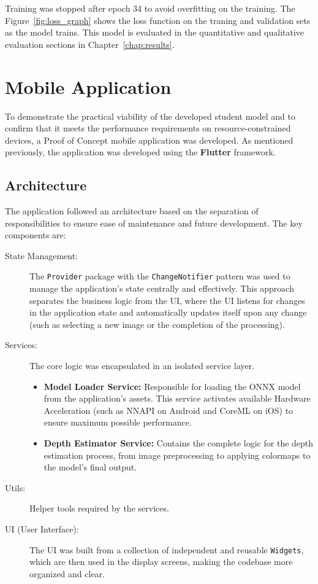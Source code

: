 Training was stopped after epoch 34 to avoid overfitting on the training. The Figure~\ref{fig:loss_graph} shows the loss function on the traning and validation sets as the model trains. This model is evaluated in the quantitative and qualitative evaluation sections in Chapter~\ref{chap:results}.

\section{Mobile Application}
\label{sec:mobile_app}

To demonstrate the practical viability of the developed student model and to confirm that it meets the performance requirements on resource-constrained devices, a Proof of Concept mobile application was developed. As mentioned previously, the application was developed using the \textbf{Flutter} framework.

\subsection{Architecture}
\label{subsec:app_arch}

The application followed an architecture based on the separation of responsibilities to ensure ease of maintenance and future development. The key components are:
\begin{description}
    \item[State Management:] The \texttt{Provider} package with the \texttt{ChangeNotifier} pattern was used to manage the application's state centrally and effectively. This approach separates the business logic from the UI, where the UI listens for changes in the application state and automatically updates itself upon any change (such as selecting a new image or the completion of the processing).
    \item[Services:] The core logic was encapsulated in an isolated service layer.
    \begin{itemize}
        \item \textbf{Model Loader Service:} Responsible for loading the ONNX model from the application's assets. This service activates available Hardware Acceleration (such as NNAPI on Android and CoreML on iOS) to ensure maximum possible performance.
        \item \textbf{Depth Estimator Service:} Contains the complete logic for the depth estimation process, from image preprocessing to applying colormaps to the model's final output.
    \end{itemize}
    \item[Utils:] Helper tools required by the services.
    \item[UI (User Interface):] The UI was built from a collection of independent and reusable \texttt{Widgets}, which are then used in the display screens, making the codebase more organized and clear.
\end{description}

